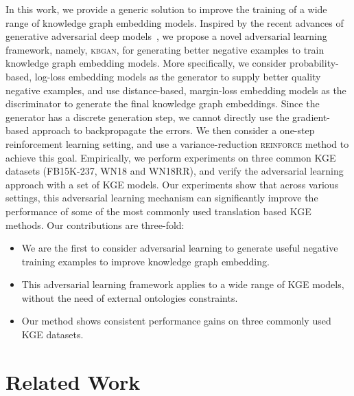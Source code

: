 \documentclass[11pt,a4paper]{article}
\begin{document}
In this work, we provide a generic solution to improve the training of a wide range of knowledge graph embedding models. Inspired by the recent advances of generative adversarial deep models~\cite{goodfellow2014generative}, we propose a novel adversarial learning framework, namely, \textsc{kbgan}, for generating better negative examples to train knowledge graph embedding models. More specifically, we consider probability-based, log-loss embedding models as the generator to supply better quality negative examples, and use distance-based, margin-loss embedding models as the discriminator to generate the final knowledge graph embeddings. Since the generator has a discrete generation step, we cannot directly use the gradient-based approach to backpropagate the errors. We then consider a one-step reinforcement learning setting, and use a variance-reduction \textsc{reinforce} method to achieve this goal. Empirically, we perform experiments on three common KGE datasets (FB15K-237, WN18 and WN18RR), and verify the adversarial learning approach with a set of KGE models. Our experiments show that across various settings, this adversarial learning mechanism can significantly improve the performance of some of the most commonly used translation based KGE methods.
Our contributions are three-fold:
\begin{itemize}
\item We are the first to consider adversarial learning to generate useful negative training examples to improve knowledge graph embedding.
\item This adversarial learning framework applies to a wide range of KGE models, without the need of external ontologies constraints.
\item Our method shows consistent performance gains on three commonly used KGE datasets.
\end{itemize}

\section{Related Work}
\end{document}
